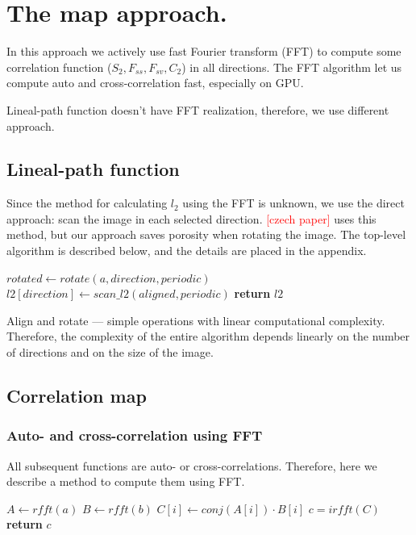 \documentclass[reprint,amsmath,amssymb,aps,pre,showkeys,showpacs,nofootinbib]{revtex4-1}
\begin{document}
\section{The map approach.}
\label{mapsec}

In this approach we actively use fast Fourier transform (FFT)
to compute some correlation function ($S_2, F_{ss}, F_{sv}, C_2$)
in all directions.
The FFT algorithm let us compute auto and cross-correlation fast,
especially on GPU.

Lineal-path function doesn't have FFT realization,
therefore, we use different approach.

\subsection{Lineal-path function}

Since the method for calculating $l_2$ using the FFT is unknown,
we use the direct approach:
scan the image in each selected direction.
\textcolor{red}{[czech paper]} uses this method,
but our approach saves porosity when rotating the image.
The top-level algorithm is described below, 
and the details are placed in the appendix.

\begin{algorithmic}[1]
      \State $rotated \gets rotate(a, direction, periodic)$
      \State $l2[direction] \gets scan\_l2(aligned, periodic)$
    \EndFor
    \State \textbf{return} $l2$
  \EndProcedure
\end{algorithmic}

Align and rotate --- simple operations with linear computational complexity.
Therefore, the complexity of the entire algorithm depends linearly 
on the number of directions and on the size of the image.

\subsection{Correlation map}

\subsubsection{Auto- and cross-correlation using FFT}

All subsequent functions are auto- or cross-correlations.
Therefore, here we describe a method to compute them using FFT.

\begin{algorithmic}[1]
    \State $A \gets rfft(a)$
    \State $B \gets rfft(b)$
      \State $C[i] \gets conj(A[i]) \cdot B[i]$
    \EndFor
    \State $c = irfft(C)$ 
    \State \textbf{return} $c$
  \EndProcedure
\end{algorithmic}
\end{document}
